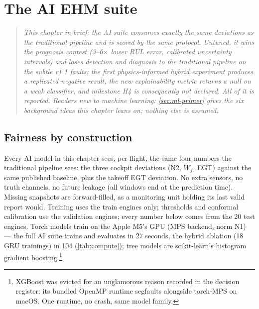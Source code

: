 \chapter{The AI EHM suite}
\label{ch:ai}

\begin{quote}\itshape
This chapter in brief: the AI suite consumes exactly the same deviations as the traditional
pipeline and is scored by the same protocol. Untuned, it wins the prognosis contest
(3--6$\times$ lower RUL error, calibrated uncertainty intervals) and loses detection and
diagnosis to the traditional pipeline on the subtle v1.1 faults; the first physics-informed
hybrid experiment produces a replicated \emph{negative} result, the new explainability
metric returns a null on a weak classifier, and milestone H4 is consequently not declared.
All of it is reported. Readers new to machine learning: \cref{sec:ml-primer} gives the
six background ideas this chapter leans on; nothing else is assumed.
\end{quote}



\section{Fairness by construction}
\label{sec:ai-fairness}

Every AI model in this chapter sees, per flight, the same four numbers the traditional
pipeline sees: the three cockpit deviations (N2, $W_f$, EGT) against the same published
baseline, plus the takeoff EGT deviation. No extra sensors, no truth channels, no future
leakage (all windows end at the prediction time). Missing snapshots are forward-filled, as a
monitoring unit holding its last valid report would. Training uses the train engines only;
thresholds and conformal calibration use the validation engines; every number below comes
from the 20 test engines. Torch models train on the Apple M5's GPU (MPS backend, norm N1) --- the full AI suite
trains and evaluates in 27 seconds, the hybrid ablation (18 GRU trainings) in 104
(\cref{tab:compute});
tree models are scikit-learn's histogram gradient boosting.\footnote{XGBoost was evicted for
an unglamorous reason recorded in the decision register: its bundled OpenMP runtime
segfaults alongside torch-MPS on macOS. One runtime, no crash, same model family.}

